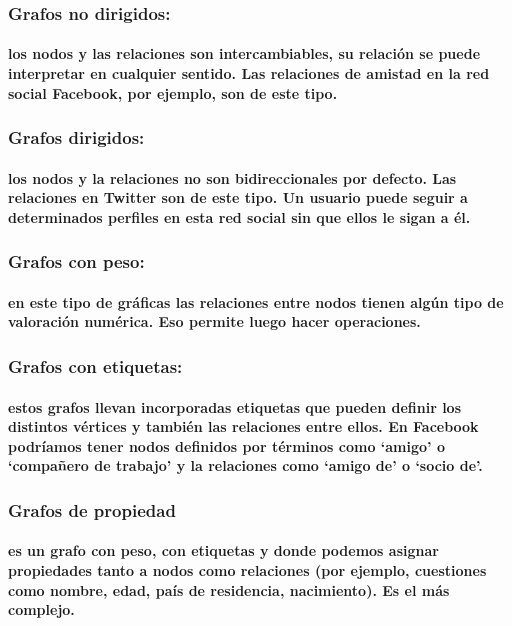 \subsubsection{ Grafos no dirigidos:}
	 \paragraph{los nodos y las relaciones son intercambiables, su relación se puede interpretar en cualquier sentido. 	Las relaciones de amistad en la red social Facebook, por ejemplo, son de este tipo.}
\subsubsection{ Grafos dirigidos:}
	 \paragraph{los nodos y la relaciones no son bidireccionales por defecto. Las relaciones en Twitter son de este      	tipo. Un usuario puede seguir a determinados perfiles en esta red social sin que ellos le sigan a él.}
\newpage
\subsubsection{Grafos con peso:}
	\paragraph{en este tipo de gráficas las relaciones entre nodos tienen algún tipo de valoración numérica. Eso permite luego hacer operaciones.}	 
\subsubsection{Grafos con etiquetas:}
	\paragraph{estos grafos llevan incorporadas etiquetas que pueden definir los distintos vértices y también las relaciones entre ellos. En Facebook podríamos tener nodos definidos por términos como ‘amigo’ o ‘compañero de trabajo’ y la relaciones como ‘amigo de’ o ‘socio de’.}
\subsubsection{Grafos de propiedad}
	\paragraph{es un grafo con peso, con etiquetas y donde podemos asignar propiedades tanto a nodos como relaciones (por ejemplo, cuestiones como nombre, edad, país de residencia, nacimiento). Es el más complejo.}
